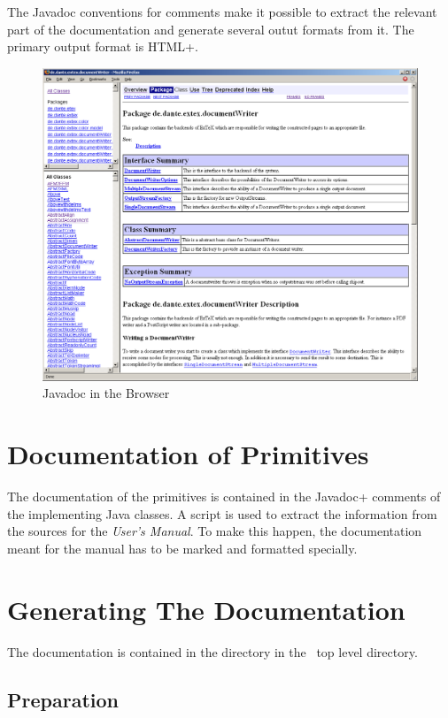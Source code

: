 The Javadoc conventions for comments make it possible to extract the
relevant part of the documentation and generate several outut formats
from it. The primary output format is \+HTML+.
\begin{figure}[tbh]
  \centering
  \includegraphics[scale=.33]{image/javadoc}
  \caption{Javadoc in the Browser}\label{fig:eclipse-javadoc}
\end{figure}


\section{Documentation of Primitives}

The documentation of the primitives is contained in the \+Javadoc+
comments of the implementing Java classes. A script is used to extract
the information from the sources for the \textit{User's Manual}. To
make this happen, the documentation meant for the manual has to be
marked and formatted specially.

\INCOMPLETE


\section{Generating The Documentation}

The documentation is contained in the directory  in the
\ExTeX\ top level directory.

\subsection{Preparation}

